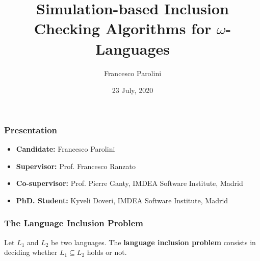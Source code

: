 \documentclass{beamer}
\title{Simulation-based Inclusion Checking Algorithms for $\omega$-Languages}
\author{Francesco Parolini}
\institute{Università degli Studi di Padova}
\date{23 July, 2020}
\begin{document}
\begin{frame}
\titlepage
\end{frame}


\begin{frame}
\frametitle{Presentation}
\begin{itemize}
\item \textbf{Candidate:} Francesco Parolini
\item \textbf{Supervisor:} Prof. Francesco Ranzato
\item \textbf{Co-supervisor:} Prof. Pierre Ganty, IMDEA Software Institute, Madrid
\item \textbf{PhD. Student:} Kyveli Doveri, IMDEA Software Institute, Madrid
\end{itemize}
\end{frame}
\begin{frame}
\frametitle{The Language Inclusion Problem}
\begin{definition}
Let $L_1$ and $L_2$ be two languages.
The \textbf{language inclusion problem} consists in deciding whether
$L_1 \subseteq L_2$ holds or not.
\end{definition}

\begin{figure}[h]
	\centering
\end{figure}
\end{frame}
\end{document}
